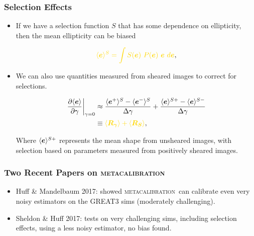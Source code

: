 \documentclass{beamer}
\newcommand{\mcal}{\textsc{metacalibration}}
\newcommand{\mcalRg}{\mbox{\boldmath $R_\gamma$}}
\newcommand{\mcalRS}{\mbox{\boldmath $R_S$}}
\newcommand{\vest}{\mbox{\boldmath $e$}}
\begin{document}
\frame
{
    \frametitle{Selection Effects}

 
    \begin{itemize}

        \item If we have a selection function $S$ that has some dependence
            on ellipticity, then the mean ellipticity
            can be biased

            \begin{align}
                {\color{gold} \langle \vest \rangle^S = \int S(\vest)~P(\vest)~\vest~d\vest},
            \end{align}


        \item We can also use quantities measured from sheared images
            to correct for selections. 

            \begin{align}
                \frac{\partial \langle \vest \rangle}{\partial \gamma}\bigg|_{\gamma=0} &\approx
                \frac{\langle \vest^+ \rangle^S - \langle \vest^- \rangle^S}{\Delta \gamma} + \frac{\langle \vest \rangle^{S+} - \langle \vest \rangle^{S-}}{\Delta \gamma} \nonumber \\
                &\equiv {\color{gold} \langle \mcalRg \rangle + \langle \mcalRS \rangle},
            \end{align}

            Where {\color{lightsteelblue} $\langle \vest \rangle^{S+}$}
            represents the mean shape from unsheared images, with selection
            based on parameters measured from
            positively sheared images.

    \end{itemize}


}

\frame
{

 
    \frametitle{Two Recent Papers on \mcal}

    \begin{itemize}

        \item Huff \& Mandelbaum 2017: showed \mcal\ can calibrate even very
            noisy estimators on the GREAT3 sims (moderately challenging).

        \item Sheldon \& Huff 2017: tests on very challenging sims,
            including selection effects, using a less noisy estimator,
            no bias found.


    \end{itemize}

}
\end{document}
